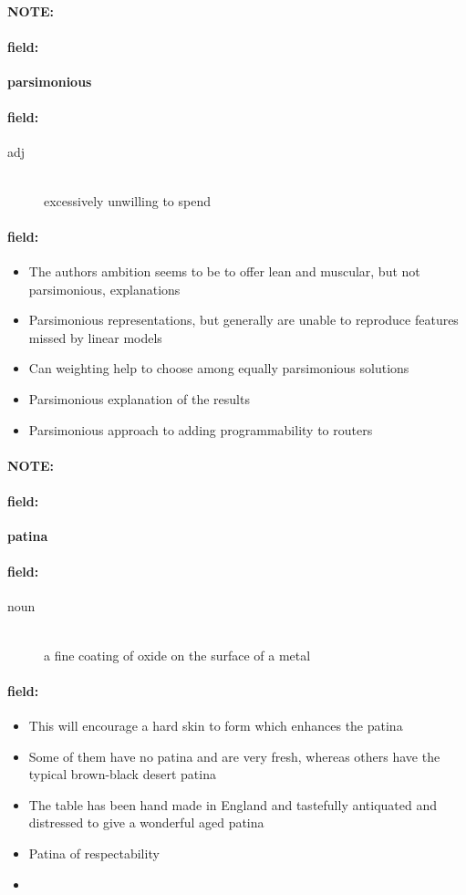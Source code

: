 \documentclass[12pt]{article}
\newenvironment{note}{\paragraph{NOTE:}}{}
\newenvironment{field}{\paragraph{field:}}{}
\begin{document}
\begin{note}
\begin{field}
\textbf{\large parsimonious}
\end{field}


\begin{field}
\begin{description}
\item[adj] \hfill \\ 
excessively unwilling to spend

\end{description}
\end{field}

\begin{field}
\begin{itemize}
\item The authors ambition seems to be to offer lean and muscular, but not parsimonious, explanations
\item Parsimonious representations, but generally are unable to reproduce features missed by linear models
\item Can weighting help to choose among equally parsimonious solutions
\item Parsimonious explanation of the results
\item Parsimonious approach to adding programmability to routers
\end{itemize}
\end{field}
\end{note}
\begin{note}
\begin{field}
\textbf{\large patina}
\end{field}


\begin{field}
\begin{description}
\item[noun] \hfill \\ 
a fine coating of oxide on the surface of a metal

\end{description}
\end{field}

\begin{field}
\begin{itemize}
\item This will encourage a hard skin to form which enhances the patina
\item Some of them have no patina and are very fresh, whereas others have the typical brown-black desert patina
\item The table has been hand made in England and tastefully antiquated and distressed to give a wonderful aged patina
\item Patina of respectability
\item  
\end{itemize}
\end{field}
\end{note}
\end{document}
